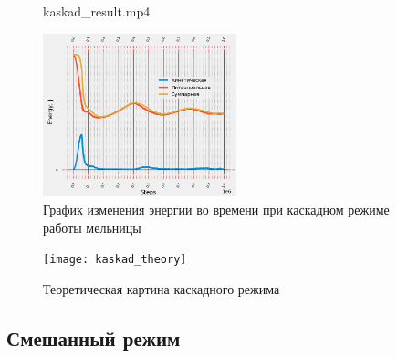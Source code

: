 \documentclass[c]{beamer}  %
\begin{document}
\begin{frame}
\frametitle{\insertsection} 
\framesubtitle{\insertsubsection}
	\begin{figure}[ht]
     		{kaskad_result.mp4}
\end{figure}
	 {
	\begin{figure}[H]
	\centering
	\includegraphics[width=0.5\textwidth]{kaskad_energy}
	\caption{График изменения энергии во времени при каскадном режиме работы мельницы}
	\label{pic:kaskad_energy}
\end{figure} 
}
{
\begin{figure}[H]
	\centering
	\texttt{[image: kaskad\_theory]} 
	\caption{Теоретическая картина каскадного режима}
\end{figure}
}
\end{frame}










\subsection{Смешанный режим}
\end{document}
